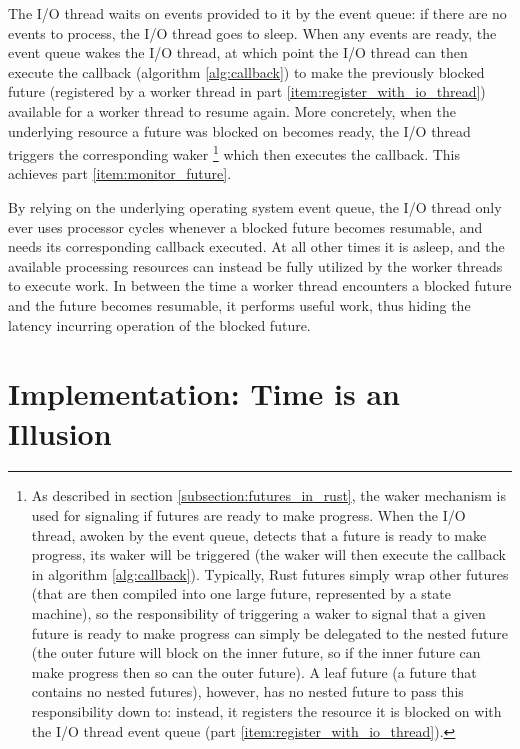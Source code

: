 \documentclass[bsc,frontabs,singlespacing,parskip,deptreport,normalheadings]{infthesis}
\begin{document}
The I/O thread waits on events provided to it by the event queue: if there are
no events to process, the I/O thread goes to sleep. When any events are ready,
the event queue wakes the I/O thread, at which point the I/O thread can then
execute the callback (algorithm \ref{alg:callback}) to make the previously
blocked future (registered by a worker thread in part
\ref{item:register_with_io_thread}) available for a worker thread to resume
again. More concretely, when the underlying resource a future was blocked on
becomes ready, the I/O thread triggers the corresponding waker \footnote{ As
    described in section \ref{subsection:futures_in_rust}, the waker mechanism
    is used for signaling if futures are ready to make progress. When the I/O
    thread, awoken by the event queue, detects that a future is ready to make
    progress, its waker will be triggered (the waker will then execute the
    callback in algorithm \ref{alg:callback}). Typically, Rust futures simply
    wrap other futures (that are then compiled into one large future,
    represented by a state machine), so the responsibility of triggering a waker
    to signal that a given future is ready to make progress can simply be
    delegated to the nested future (the outer future will block on the inner
    future, so if the inner future can make progress then so can the outer
    future). A leaf future (a future that contains no nested futures), however,
has no nested future to pass this responsibility down to: instead, it registers
the resource it is blocked on with the I/O thread event queue (part
\ref{item:register_with_io_thread}).} which then executes the callback. This
achieves part \ref{item:monitor_future}.

By relying on the underlying operating system event queue, the I/O thread only
ever uses processor cycles whenever a blocked future becomes resumable, and
needs its corresponding callback executed. At all other times it is asleep, and
the available processing resources can instead be fully utilized by the worker
threads to execute work. In between the time a worker thread encounters a
blocked future and the future becomes resumable, it performs useful work, thus
hiding the latency incurring operation of the blocked future.


\chapter{Implementation: Time is an Illusion}
\end{document}
